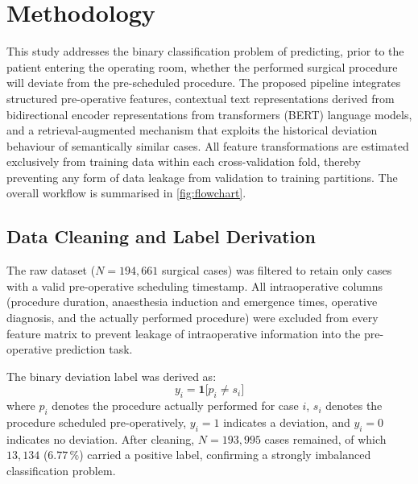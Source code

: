 
\section{Methodology}
\label{sec:methods}

This study addresses the binary classification problem of predicting, prior to
the patient entering the operating room, whether the performed surgical
procedure will deviate from the pre-scheduled procedure.  The proposed pipeline
integrates structured pre-operative features, contextual text representations
derived from bidirectional encoder representations from transformers (BERT)
language models, and a retrieval-augmented mechanism that exploits the
historical deviation behaviour of semantically similar cases.  All feature transformations are estimated
exclusively from training data within each cross-validation fold, thereby
preventing any form of data leakage from validation to training partitions.
The overall workflow is summarised in \cref{fig:flowchart}.

\subsection{Data Cleaning and Label Derivation}
\label{sec:cleaning}

The raw dataset ($N = 194{,}661$ surgical cases) was filtered to retain only
cases with a valid pre-operative scheduling timestamp.  All intraoperative
columns (procedure duration, anaesthesia induction and emergence times,
operative diagnosis, and the actually performed procedure) were excluded from
every feature matrix to prevent leakage of intraoperative information into the
pre-operative prediction task.

The binary deviation label was derived as:
\begin{equation}
  y_i = \mathbf{1}\bigl[
        p_i \neq s_i
        \bigr]
  \label{eq:label}
\end{equation}
where $p_i$ denotes the procedure actually performed for case $i$, $s_i$
denotes the procedure scheduled pre-operatively, $y_i = 1$ indicates a
deviation, and $y_i = 0$ indicates no deviation.  After cleaning,
$N = 193{,}995$ cases remained, of which $13{,}134$ ($6.77\,\%$) carried a
positive label, confirming a strongly imbalanced classification problem.

